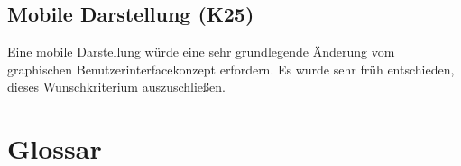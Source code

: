 \documentclass[parskip=full,11pt,twoside]{scrartcl}
\begin{document}

    \subsection{Mobile Darstellung (K25)}
    Eine mobile Darstellung würde eine sehr grundlegende Änderung vom graphischen Benutzerinterfacekonzept erfordern.
    Es wurde sehr früh entschieden, dieses Wunschkriterium auszuschließen.

    \section{Glossar}
\end{document}
